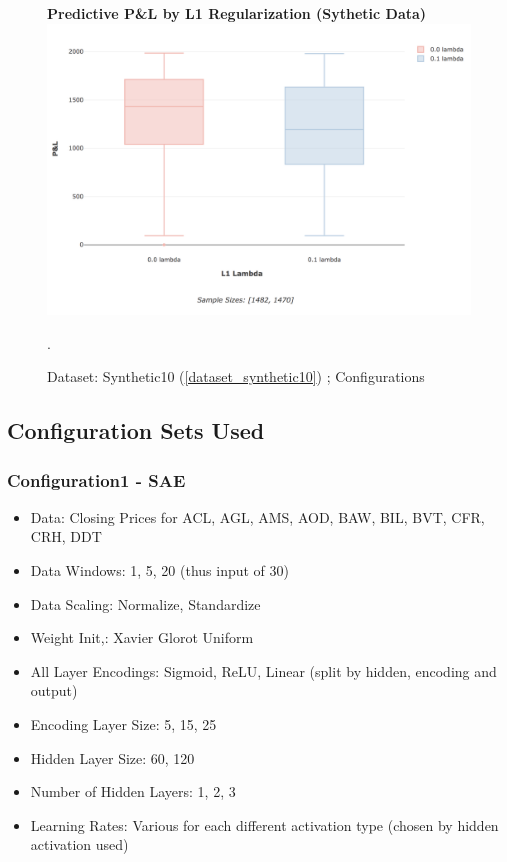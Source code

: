 \documentclass[a4paper,11pt,oneside]{article}
\theoremstyle{plain}
\theoremstyle{definition}
\begin{document}
\begin{figure}[H]
	\centering 
	\textbf{Predictive P\&L by L1 Regularization  (Sythetic Data)}
	\includegraphics[scale=0.3]{images/results/network/reg/synth_pl_reg.png} 
	\caption{Dataset: Synthetic10 (\ref{dataset_synthetic10}) ; Configurations 
		\newline }.
	\label{figure-synth_pl_reg}
\end{figure}













\newpage
\subsection{Configuration Sets Used}

\subsubsection{Configuration1 - SAE}\label{config1}

\begin{itemize}
	\item Data: Closing Prices for ACL, AGL, AMS, AOD, BAW, BIL, BVT, CFR, CRH, DDT
	\item Data Windows: 1, 5, 20 (thus input of 30)
	\item Data Scaling: Normalize, Standardize
	\item Weight Init,: Xavier Glorot Uniform
	\item All Layer Encodings: Sigmoid, ReLU, Linear (split by hidden, encoding and output)
	\item Encoding Layer Size: 5, 15, 25
	\item Hidden Layer Size: 60, 120
	\item Number of Hidden Layers: 1, 2, 3
	\item Learning Rates: Various for each different activation type (chosen by hidden activation used)
\end{itemize}
\end{document}
